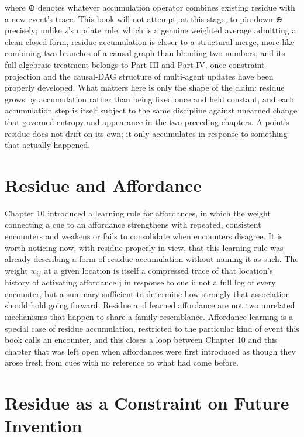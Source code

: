 where ⊕ denotes whatever accumulation operator combines existing residue with a new event's trace. This book will not attempt, at this stage, to pin down ⊕ precisely; unlike z's update rule, which is a genuine weighted average admitting a clean closed form, residue accumulation is closer to a structural merge, more like combining two branches of a causal graph than blending two numbers, and its full algebraic treatment belongs to Part III and Part IV, once constraint projection and the causal-DAG structure of multi-agent updates have been properly developed. What matters here is only the shape of the claim: residue grows by accumulation rather than being fixed once and held constant, and each accumulation step is itself subject to the same discipline against unearned change that governed entropy and appearance in the two preceding chapters. A point's residue does not drift on its own; it only accumulates in response to something that actually happened.

\section{Residue and Affordance}

Chapter 10 introduced a learning rule for affordances, in which the weight connecting a cue to an affordance strengthens with repeated, consistent encounters and weakens or fails to consolidate when encounters disagree. It is worth noticing now, with residue properly in view, that this learning rule was already describing a form of residue accumulation without naming it as such. The weight \(w_{ij}\) at a given location is itself a compressed trace of that location's history of activating affordance j in response to cue i: not a full log of every encounter, but a summary sufficient to determine how strongly that association should hold going forward. Residue and learned affordance are not two unrelated mechanisms that happen to share a family resemblance. Affordance learning is a special case of residue accumulation, restricted to the particular kind of event this book calls an encounter, and this closes a loop between Chapter 10 and this chapter that was left open when affordances were first introduced as though they arose fresh from cues with no reference to what had come before.

\section{Residue as a Constraint on Future Invention}

